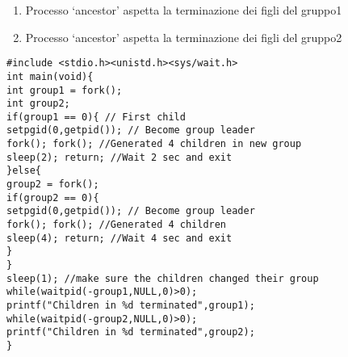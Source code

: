 \begin{flushleft}
\begin{flushleft}
\begin{flushleft}
\begin{enumerate}
\begin{enumerate}
        \end{enumerate}
        \item Processo ‘ancestor’ aspetta la terminazione dei figli del gruppo1
        \item Processo ‘ancestor’ aspetta la terminazione dei figli del gruppo2
      \end{enumerate}
      \texttt{\#include <stdio.h><unistd.h><sys/wait.h> \\
      int main(void)\{\\
      \halftab int group1 = fork(); \\
      \halftab int group2;\\
      \halftab if(group1 == 0)\{ // First child\\
      \tab setpgid(0,getpid()); // Become group leader\\
      \tab fork(); fork(); //Generated 4 children in new group\\
      \tab sleep(2); return; //Wait 2 sec and exit\\
      \halftab \}else\{\\
      \tab group2 = fork();\\
      \tab if(group2 == 0)\{\\
      \tab \halftab setpgid(0,getpid()); // Become group leader\\
      \tab \halftab fork(); fork(); //Generated 4 children\\
      \tab \halftab sleep(4); return; //Wait 4 sec and exit\\
      \tab \}\\
      \halftab \}\\
      \halftab sleep(1); //make sure the children changed their group\\
      \halftab while(waitpid(-group1,NULL,0)>0);\\
      \halftab printf("Children in \%d terminated\n",group1);\\
      \halftab while(waitpid(-group2,NULL,0)>0);\\
      \halftab printf("Children in \%d terminated\n",group2);\\
      \} \\
      }
    \end{flushleft}
  \end{flushleft}
\end{flushleft}